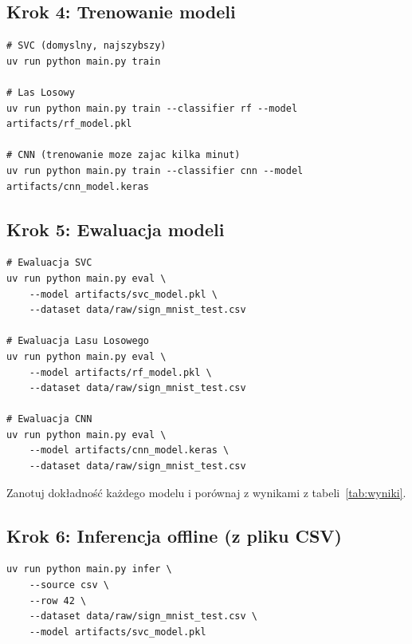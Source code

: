 \subsection*{Krok 4: Trenowanie modeli}

\begin{lstlisting}[style=styleBash, numbers=none, caption={Trenowanie wszystkich trzech klasyfikatorów}, label=lst:train-all]
# SVC (domyslny, najszybszy)
uv run python main.py train

# Las Losowy
uv run python main.py train --classifier rf --model artifacts/rf_model.pkl

# CNN (trenowanie moze zajac kilka minut)
uv run python main.py train --classifier cnn --model artifacts/cnn_model.keras
\end{lstlisting}

\subsection*{Krok 5: Ewaluacja modeli}

\begin{lstlisting}[style=styleBash, numbers=none, caption={Ewaluacja wytrenowanych modeli}, label=lst:eval-all]
# Ewaluacja SVC
uv run python main.py eval \
    --model artifacts/svc_model.pkl \
    --dataset data/raw/sign_mnist_test.csv

# Ewaluacja Lasu Losowego
uv run python main.py eval \
    --model artifacts/rf_model.pkl \
    --dataset data/raw/sign_mnist_test.csv

# Ewaluacja CNN
uv run python main.py eval \
    --model artifacts/cnn_model.keras \
    --dataset data/raw/sign_mnist_test.csv
\end{lstlisting}

Zanotuj dokładność każdego modelu i porównaj z wynikami z tabeli~\ref{tab:wyniki}.

\subsection*{Krok 6: Inferencja offline (z pliku CSV)}

\begin{lstlisting}[style=styleBash, numbers=none, caption={Inferencja na wybranym wierszu pliku CSV}, label=lst:infer-csv]
uv run python main.py infer \
    --source csv \
    --row 42 \
    --dataset data/raw/sign_mnist_test.csv \
    --model artifacts/svc_model.pkl
\end{lstlisting}

